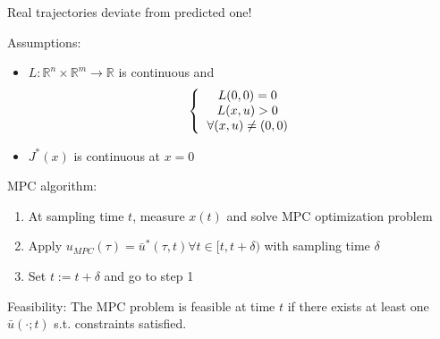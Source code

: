 Real trajectories deviate from predicted one!

Assumptions:
\begin{itemize}
\item $L: \mathbb{R}^n \times \mathbb{R}^m \to \mathbb{R}$ is continuous and 
\begin{equation}
\left \{
  \begin{tabular}{c}
  $L(0,0)=0$ \\
  $L(x,u) > 0$ \\
  $\forall (x,u) \neq (0,0)$
  \end{tabular}
 \right.
\end{equation}
\item $J^*(x)$ is continuous at $x=0$
\end{itemize}

MPC algorithm:
\begin{enumerate}
\item At sampling time $t$, measure $x(t)$ and solve MPC optimization problem 
\item Apply $u_{MPC}(\tau) = \bar u^*(\tau, t) \forall t \in [t, t+\delta)$ with sampling time $\delta$
\item Set $t := t + \delta $ and go to step 1
\end{enumerate}

Feasibility: The MPC problem is feasible at time $t$ if there exists at least one $\bar u(\cdot; t)$ s.t. constraints satisfied.

